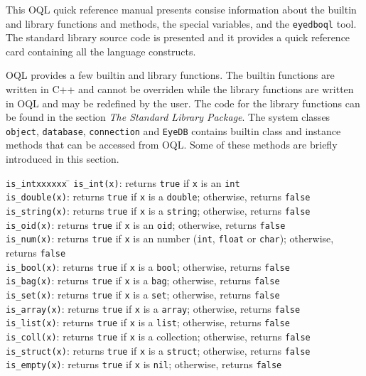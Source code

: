 \newpage
{}
\label{quickref}
This OQL quick reference manual presents consise information about
the builtin and library functions and methods, the special variables,
and the \texttt{eyedboql} tool. The standard library source code
is presented and it provides a quick reference card containing
all the language constructs.

OQL provides a few builtin and library functions. The builtin functions
are written in C++ and cannot be overriden while the library functions
are written in OQL and may be redefined by the user.
The code for the library functions can be found in the section
\emph{The Standard Library Package}. The \eyedb system classes
\texttt{object}, \texttt{database}, \texttt{connection} and \texttt{EyeDB} contains
builtin class and instance methods that can be accessed from OQL.
Some of these methods are briefly introduced in this section.

\begin{tabbing}
\texttt{is\_intxxxxxx} \= \kill
\texttt{is\_int(x)}\>: returns \texttt{true} if \texttt{x} is an \texttt{int}\\
\texttt{is\_double(x)}\>: returns \texttt{true} if \texttt{x} is
a \texttt{double}; otherwise, returns \texttt{false}\\
\texttt{is\_string(x)}\>: returns \texttt{true} if \texttt{x} is
a \texttt{string}; otherwise, returns \texttt{false}\\
\texttt{is\_oid(x)}\>: returns \texttt{true} if \texttt{x} is
an \texttt{oid}; otherwise, returns \texttt{false}\\
\texttt{is\_num(x)}\>: returns \texttt{true} if \texttt{x} is
an number (\texttt{int}, \texttt{float} or \texttt{char});
otherwise, returns \texttt{false}\\
\texttt{is\_bool(x)}\>: returns \texttt{true} if \texttt{x} is
a \texttt{bool}; otherwise, returns \texttt{false}\\
\texttt{is\_bag(x)}\>: returns \texttt{true} if \texttt{x} is
a \texttt{bag}; otherwise, returns \texttt{false}\\
\texttt{is\_set(x)}\>: returns \texttt{true} if \texttt{x} is
a \texttt{set}; otherwise, returns \texttt{false}\\
\texttt{is\_array(x)}\>: returns \texttt{true} if \texttt{x} is
a \texttt{array}; otherwise, returns \texttt{false}\\
\texttt{is\_list(x)}\>: returns \texttt{true} if \texttt{x} is
a \texttt{list}; otherwise, returns \texttt{false}\\
\texttt{is\_coll(x)}\>: returns \texttt{true} if \texttt{x} is
a collection; otherwise, returns \texttt{false}\\
\texttt{is\_struct(x)}\>: returns \texttt{true} if \texttt{x} is
a \texttt{struct}; otherwise, returns \texttt{false}\\
\texttt{is\_empty(x)}\>: returns \texttt{true} if \texttt{x} is
\texttt{nil}; otherwise, returns \texttt{false}\\
\end{tabbing}

